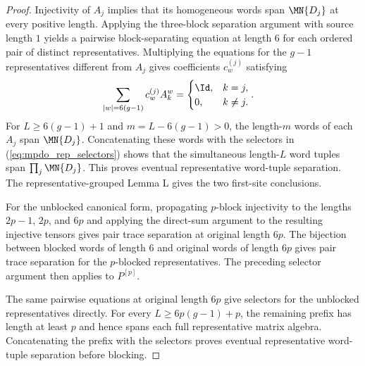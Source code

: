 \begin{proof}
    \leanok
    Injectivity of $A_j$ implies that its homogeneous words span
    $\MN{D_j}$ at every positive length. Applying the three-block separation
    argument with source length $1$ yields a pairwise block-separating
    equation at length $6$ for each ordered pair of distinct representatives.
    Multiplying the equations for the $g-1$ representatives different
    from $A_j$ gives coefficients $c_w^{(j)}$ satisfying
    \begin{align}
        \sum_{|w|=6(g-1)}c_w^{(j)}A_k^w
         & =
        \begin{cases}
            \Id, & k=j,     \\
            0,   & k\neq j.
        \end{cases}.
        \label{eq:mpdo_rep_selectors}
    \end{align}
    For $L\geq6(g-1)+1$ and $m=L-6(g-1)>0$, the length-$m$ words of each
    $A_j$ span $\MN{D_j}$. Concatenating these words with the selectors
    in (\ref{eq:mpdo_rep_selectors}) shows that the simultaneous length-$L$
    word tuples span $\prod_j\MN{D_j}$. This proves eventual representative
    word-tuple separation. The representative-grouped Lemma L gives the two
    first-site conclusions.

    For the unblocked canonical form, propagating $p$-block injectivity to the
    lengths $2p-1$, $2p$, and $6p$ and applying the direct-sum argument to the
    resulting injective tensors gives pair trace separation at original
    length $6p$. The
    bijection between blocked words of length $6$ and original words of length
    $6p$ gives pair trace separation for the $p$-blocked
    representatives. The preceding selector argument then applies to $P^{[p]}$.

    The same pairwise equations at original length $6p$ give selectors for
    the unblocked representatives directly. For every
    $L\geq6p(g-1)+p$, the remaining prefix has length at least $p$ and hence
    spans each full representative matrix algebra. Concatenating the prefix
    with the selectors proves eventual representative word-tuple separation
    before blocking.


\end{proof}
